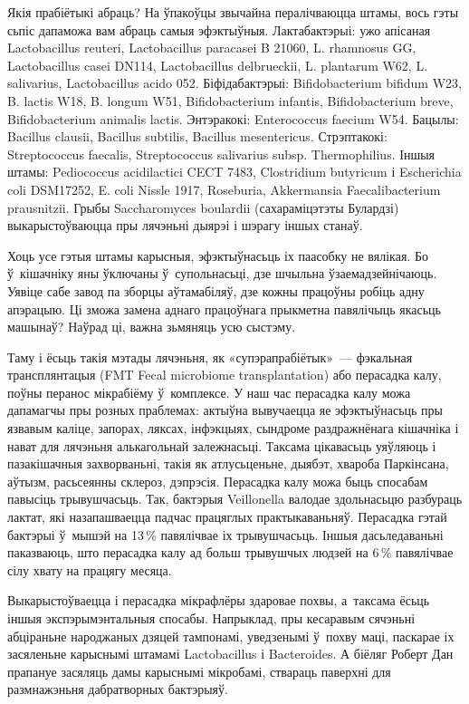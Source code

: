 Якія прабіётыкі абраць? На ўпакоўцы звычайна пералічваюцца штамы, вось гэты сьпіс дапаможа вам абраць самыя эфэктыўныя. Лактабактэрыі: ужо апісаная Lactobacillus reuteri, Lactobacillus paracasei B 21060, L. rhamnosus GG, Lactobacillus casei DN114, Lactobacillus delbrueckii, L. plantarum W62, L. salivarius, Lactobacillus acido 052. Біфідабактэрыі: Bifidobacterium bifidum W23, B. lactis W18, B. longum W51, Bifidobacterium infantis, Bifidobacterium breve, Bifidobacterium animalis lactis. Энтэракокі: Enterococcus faecium W54. Бацылы: Bacillus clausii, Bacillus subtilis, Bacillus mesentericus. Стрэптакокі: Streptococcus faecalis, Streptococcus salivarius subsp. Thermophilius. Іншыя штамы: Pediococcus acidilactici CECT 7483, Clostridium butyricum і Escherichia coli DSM17252, E. coli Nissle 1917, Roseburia, Akkermansia Faecalibacterium prausnitzii. Грыбы Saccharomyces boulardii (сахараміцэтэты Булардзі) выкарыстоўваюцца пры лячэньні дыярэі і шэрагу іншых станаў.

Хоць усе гэтыя штамы карысныя, эфэктыўнасьць іх паасобку не вялікая. Бо ў~кішачніку яны ўключаны ў~супольнасьці, дзе шчыльна ўзаемадзейнічаюць. Уявіце сабе завод па зборцы аўтамабіляў, дзе кожны працоўны робіць адну апэрацыю. Ці зможа замена аднаго працоўнага прыкметна павялічыць якасьць машынаў? Наўрад ці, важна зьмяняць усю сыстэму.

Таму і ёсьць такія мэтады лячэньня, як «супэрапрабіётык»~--- фэкальная трансплянтацыя (FMT Fecal microbiome transplantation) або перасадка калу, поўны перанос мікрабіёму ў~комплексе. У наш час перасадка калу можа дапамагчы пры розных праблемах: актыўна вывучаецца яе эфэктыўнасьць пры язвавым каліце, запорах, ляксах, інфэкцыях, сындроме раздражнёнага кішачніка і нават для лячэньня алькагольнай залежнасьці. Таксама цікавасьць уяўляюць і пазакішачныя захворваньні, такія як атлусьценьне, дыябэт, хвароба Паркінсана, аўтызм, расьсеянны склероз, дэпрэсія. Перасадка калу можа быць спосабам павысіць трывушчасьць. Так, бактэрыя Veillonella валодае здольнасьцю разбураць лактат, які назапашваецца падчас працяглых практыкаваньняў. Перасадка гэтай бактэрыі ў~мышэй на 13\,\% павялічвае іх трывушчасьць. Іншыя дасьледаваньні паказваюць, што перасадка калу ад больш трывушчых людзей на 6\,\% павялічвае сілу хвату на працягу месяца.

Выкарыстоўваецца і перасадка мікрафлёры здаровае похвы, а~таксама ёсьць іншыя экспэрымэнтальныя спосабы. Напрыклад, пры кесаравым сячэньні абціраньне народжаных дзяцей тампонамі, уведзенымі ў~похву маці, паскарае іх засяленьне карыснымі штамамі Lactobacillus і Bacteroides. А біёляг Роберт Дан прапануе засяляць дамы карыснымі мікробамі, ствараць паверхні для размнажэньня дабратворных бактэрыяў.

